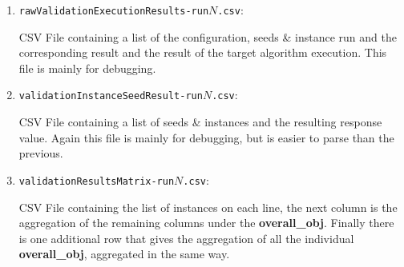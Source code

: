 \documentclass[manual.tex]{subfiles}
\begin{document}
\begin{enumerate}


\item \texttt{rawValidationExecutionResults-run$N$.csv}:

 CSV File containing a list of the configuration, 
seeds \& instance run and the corresponding result and the result of the target algorithm execution. This file is mainly for debugging.

\item 
\texttt{validationInstanceSeedResult-run$N$.csv}:

 CSV File containing a list of seeds \&
instances and the resulting response value. Again this file is mainly for debugging, but is easier to parse than the previous.
\item 
\texttt{validationResultsMatrix-run$N$.csv}:

CSV File containing the list of instances
on each line, the next column is the aggregation of the remaining columns under the 
\textbf{overall\_obj}. Finally there is one additional row that
gives the aggregation of all the individual \textbf{overall\_obj},
aggregated in the same way.
\end{enumerate}
\end{document}
